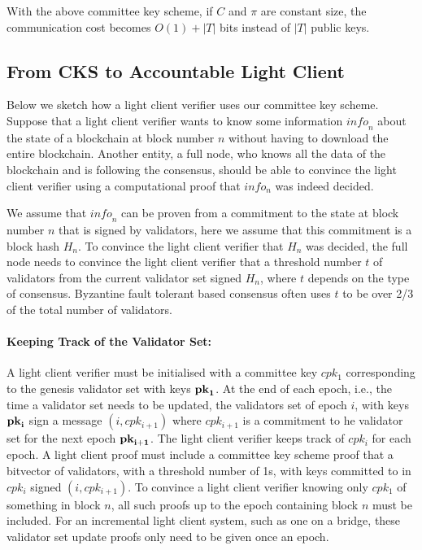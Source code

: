 \noindent With the above committee key scheme, if $C$ and $\pi$ are constant size, 
the communication cost becomes $O(1)+|T|$ bits instead of $|T|$ public keys.


\subsection{From CKS to Accountable Light Client}
\label{sec_intro_committee}

Below we sketch how a light client verifier uses our committee key scheme. Suppose that a light client verifier wants to know some information $\mathit{info}_n$ about the state of a blockchain at block number $n$ without having to download the entire blockchain. Another entity, a full node, who knows all the data of the blockchain and is following the consensus, should be able to convince the light client verifier using a computational proof that $info_n$ was indeed decided.

We assume that $\mathit{info}_n$ can be proven from a commitment to the state at block number $n$ that is signed by validators, here we assume that this commitment is a block hash $H_n$. To convince the light client verifier that $H_n$  was decided, the full node needs to convince the light client verifier that a threshold number $t$ of validators from the current validator set signed $H_n$, where $t$ depends on the type of consensus. Byzantine fault tolerant based consensus often uses $t$ to be over 2/3 of the total number of validators.

\noindent\paragraph{Keeping Track of the Validator Set:} A light client verifier must be initialised with a committee key $cpk_1$ corresponding to the genesis validator set with keys $\bf{pk}_1$. At the end of each epoch, i.e., the time a validator set needs to be updated, the validators set of epoch $i$, with keys $\bf{pk}_i$ sign a message $(i,cpk_{i+1})$ where $cpk_{i+1}$ is a commitment to he validator set for the next epoch $\bf{pk}_{i+1}$. The light client verifier keeps track of $cpk_i$ for each epoch. A light client proof must include a committee key scheme proof that a bitvector of validators, with a threshold number of 1s, with keys committed to in $cpk_i$ signed $(i,cpk_{i+1})$. To convince a light client verifier knowing only $cpk_1$ of something in block $n$, all such proofs up to the epoch containing block $n$ must be included. For an incremental light client system, such as one on a bridge, these validator set update proofs only need to be given once an epoch.
\vspace{-0.05in}

